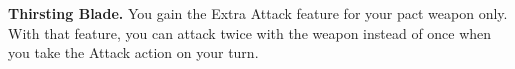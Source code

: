 \textbf{Thirsting Blade.} You gain the Extra Attack feature for your pact weapon only. With that feature, you can attack twice with the weapon instead of once when you take the Attack action on your turn.

